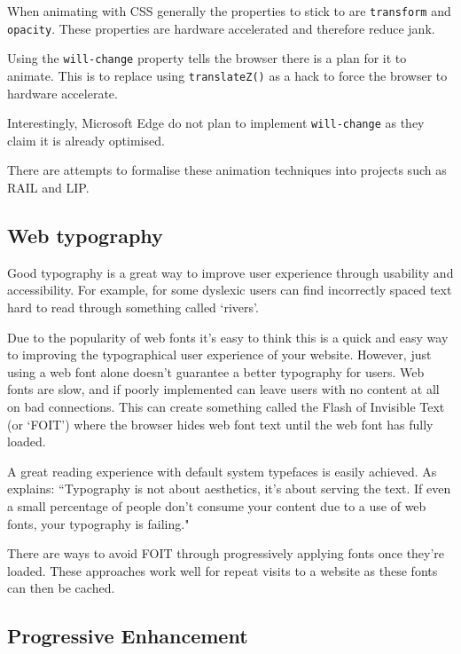 When animating with CSS generally the properties to stick to are \verb|transform| and \verb|opacity|. These properties are hardware accelerated and therefore reduce jank. \cite{high_perf_animations} \cite{css_triggers}

Using the \verb|will-change| property tells the browser there is a plan for it to animate. This is to replace using \verb|translateZ()| as a hack to force the browser to hardware accelerate. \cite{animations_and_performance}

Interestingly, Microsoft Edge do not plan to implement \verb|will-change| as they claim it is already optimised. \cite{will_change_edge}

There are attempts to formalise these animation techniques into projects such as RAIL and LIP. \cite{introducing_RAIL} \cite{FLIP}

\subsection{Web typography} \label{l-r--web-type}

Good typography is a great way to improve user experience through usability and accessibility. For example, for some dyslexic users can find incorrectly spaced text hard to read through something called `rivers'. \cite{dyslexia}

Due to the popularity of web fonts it's easy to think this is a quick and easy way to improving the typographical user experience of your website. However, just using a web font alone doesn't guarantee a better typography for users. Web fonts are slow, and if poorly implemented can leave users with no content at all on bad connections. This can create something called the Flash of Invisible Text (or `FOIT') where the browser hides web font text until the web font has fully loaded. \cite{FOIT}

A great reading experience with default system typefaces is easily achieved. As \cite{against_webfonts} explains: ``Typography is not about aesthetics, it's about serving the text. If even a small percentage of people don't consume your content due to a use of web fonts, your typography is failing."

There are ways to avoid FOIT through progressively applying fonts once they're loaded. These approaches work well for repeat visits to a website as these fonts can then be cached. \cite{FOIT}

\subsection{Progressive Enhancement} \label{l-r--progressive-enhancement}

